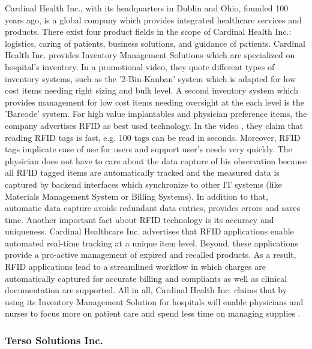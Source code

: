 Cardinal Health Inc., with its headquarters in Dublin and Ohio, founded 100 years ago,  \cite{cardinal_web} is a global company which provides integrated healthcare services and products. There exist four product fields in the scope of Cardinal Health Inc.: logistics, caring of patients, business solutions, and guidance of patients.
Cardinal Health Inc. provides Inventory Management Solutions \cite{cardinal_video} which are specialized on hospital's inventory. In a promotional video, they quote different types of inventory systems, such as the '2-Bin-Kanban' system which is adapted for low cost items needing right sizing and bulk level. A second inventory system which provides management for low cost items needing oversight at the each level is the 'Barcode' system. For high value implantables and physician preference items, the company advertises RFID as best used technology. In the video \cite{cardinal_video}, they claim that reading RFID tags is fast, e.g. 100 tags can be read in seconds. Moreover, RFID tags implicate ease of use for users and support user's needs very quickly. The physician does not have to care about the data capture of his observation because all RFID tagged items are automatically tracked and the measured data is captured by backend interfaces which synchronize to other IT systems (like Materials Management System or Billing Systems). In addition to that, automatic data capture avoids redundant data entries, provides errors and saves time.
Another important fact about RFID technology is its accuracy and uniqueness. Cardinal Healthcare Inc. advertises that RFID applications enable automated real-time tracking at a unique item level. Beyond, these applications provide a pro-active management of expired and recalled products. As a result, RFID applications lead to a streamlined workflow in which charges are automatically captured for accurate billing and compliants as well as clinical documentation are supported. 
All in all, Cardinal Health Inc. claims that by using its Inventory Management Solution for hospitals will enable physicians and nurses to focus more on patient care and spend less time on managing supplies  \cite{cardinal_video}.

\subsubsection{Terso Solutions Inc.}

